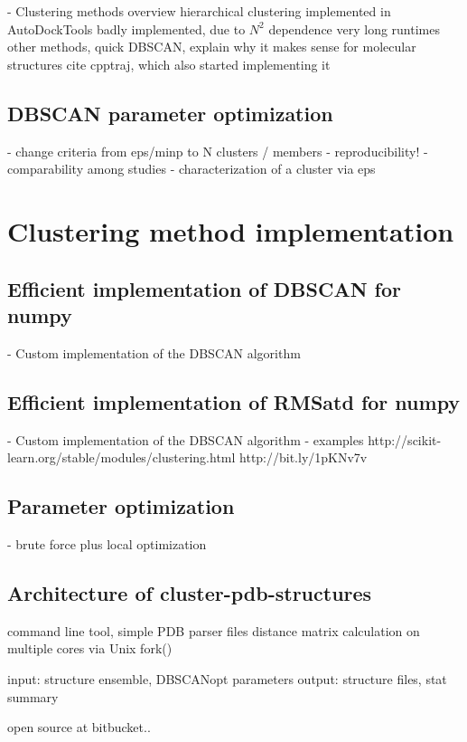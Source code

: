     - Clustering methods overview
        hierarchical clustering implemented in AutoDockTools
            badly implemented, due to $N^2$ dependence very long runtimes
        other methods, quick
        DBSCAN, explain why it makes sense for molecular structures
        cite cpptraj, which also started implementing it

\subsection{DBSCAN parameter optimization}

    - change criteria from eps/minp to N clusters / members
    - reproducibility!
    - comparability among studies
    - characterization of a cluster via eps


\section{Clustering method implementation}

\subsection{Efficient implementation of DBSCAN for numpy}

        - Custom implementation of the DBSCAN algorithm

\subsection{Efficient implementation of RMSatd for numpy}

        - Custom implementation of the DBSCAN algorithm
        - examples
            http://scikit-learn.org/stable/modules/clustering.html
            http://bit.ly/1pKNv7v


\subsection{Parameter optimization}

        - brute force plus local optimization

\subsection{Architecture of cluster-pdb-structures}

            command line tool, simple PDB parser files
            distance matrix calculation on multiple cores via Unix fork()

            input: structure ensemble, DBSCANopt parameters
            output: structure files, stat summary


            open source at bitbucket..


